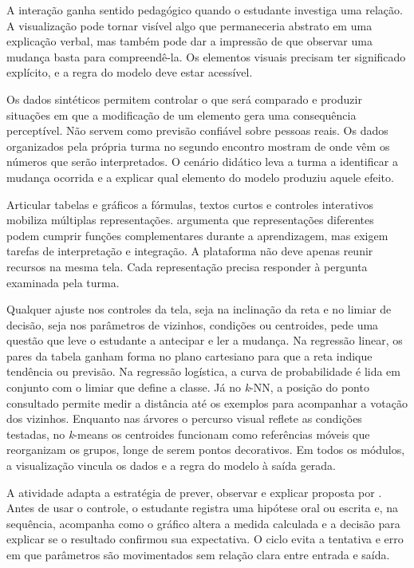 A interação ganha sentido pedagógico quando o estudante investiga uma relação. A visualização pode tornar visível algo que permaneceria abstrato em uma explicação verbal, mas também pode dar a impressão de que observar uma mudança basta para compreendê-la. Os elementos visuais precisam ter significado explícito, e a regra do modelo deve estar acessível.

Os dados sintéticos permitem controlar o que será comparado e produzir situações em que a modificação de um elemento gera uma consequência perceptível. Não servem como previsão confiável sobre pessoas reais. Os dados organizados pela própria turma no segundo encontro mostram de onde vêm os números que serão interpretados. O cenário didático leva a turma a identificar a mudança ocorrida e a explicar qual elemento do modelo produziu aquele efeito.

Articular tabelas e gráficos a fórmulas, textos curtos e controles interativos mobiliza múltiplas representações.  argumenta que representações diferentes podem cumprir funções complementares durante a aprendizagem, mas exigem tarefas de interpretação e integração. A plataforma não deve apenas reunir recursos na mesma tela. Cada representação precisa responder à pergunta examinada pela turma.

Qualquer ajuste nos controles da tela, seja na inclinação da reta e no limiar de decisão, seja nos parâmetros de vizinhos, condições ou centroides, pede uma questão que leve o estudante a antecipar e ler a mudança. Na regressão linear, os pares da tabela ganham forma no plano cartesiano para que a reta indique tendência ou previsão. Na regressão logística, a curva de probabilidade é lida em conjunto com o limiar que define a classe. Já no \textit{k}-NN, a posição do ponto consultado permite medir a distância até os exemplos para acompanhar a votação dos vizinhos. Enquanto nas árvores o percurso visual reflete as condições testadas, no \textit{k}-means os centroides funcionam como referências móveis que reorganizam os grupos, longe de serem pontos decorativos. Em todos os módulos, a visualização vincula os dados e a regra do modelo à saída gerada.

A atividade adapta a estratégia de prever, observar e explicar proposta por . Antes de usar o controle, o estudante registra uma hipótese oral ou escrita e, na sequência, acompanha como o gráfico altera a medida calculada e a decisão para explicar se o resultado confirmou sua expectativa. O ciclo evita a tentativa e erro em que parâmetros são movimentados sem relação clara entre entrada e saída.

